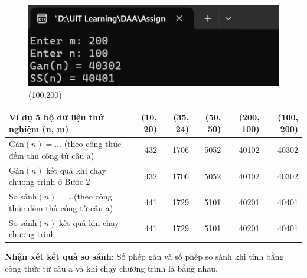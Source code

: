 \documentclass[12pt, letterpaper]{article}
\begin{document}
\begin{enumerate}
\begin{figure}[!]
\end{figure}
\begin{figure}[!]
	\centering
	\caption{(100,200)}
	\includegraphics{Bai11_5}
\end{figure}

\renewcommand{\arraystretch}{2}
\begin{tabular}{m{10em} r r r r r}
    Ví dụ 5 bộ dữ liệu thử nghiệm (n, m)                           & (10, 20) & (35, 24) & (50, 50) & (200, 100) & (100, 200) \\
    \midrule
    Gán$ (n) = \ldots $ (theo công thức đếm thủ công từ câu a)     & 432      & 1706     & 5052     & 40102      & 40302      \\
    Gán$ (n) $ kết quả khi chạy chương trình ở Bước 2              & 432      & 1706     & 5052     & 40102      & 40302      \\
    So sánh$ (n) $ = \ldots (theo công thức đếm thủ công từ câu a) & 441      & 1729     & 5101     & 40201      & 40401      \\
    So sánh$ (n) $ kết quả khi chạy chương trình                   & 441      & 1729     & 5101     & 40201      & 40401      \\
\end{tabular}

\textbf{Nhận xét kết quả so sánh:} Số phép gán và số phép so sánh  khi tính bằng công thức từ câu a và khi chạy chương trình là bằng nhau.
\end{enumerate}
\end{document}
